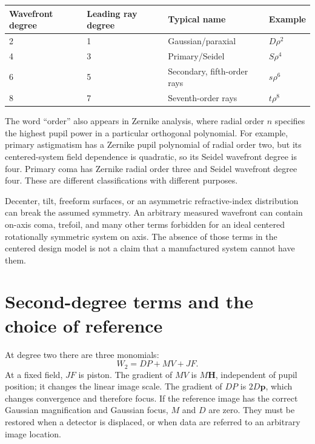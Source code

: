 \begin{center}
\begin{tabular}{llll}
\toprule
Wavefront degree & Leading ray degree & Typical name & Example\\
\midrule
2 & 1 & Gaussian/paraxial & $D\rho^2$\\
4 & 3 & Primary/Seidel & $S\rho^4$\\
6 & 5 & Secondary, fifth-order rays & $s\rho^6$\\
8 & 7 & Seventh-order rays & $t\rho^8$\\
\bottomrule
\end{tabular}
\end{center}

The word ``order'' also appears in Zernike analysis, where radial order $n$
specifies the highest pupil power in a particular orthogonal polynomial. For
example, primary astigmatism has a Zernike pupil polynomial of radial order
two, but its centered-system field dependence is quadratic, so its Seidel
wavefront degree is four. Primary coma has Zernike radial order three and
Seidel wavefront degree four. These are different classifications with
different purposes.

Decenter, tilt, freeform surfaces, or an asymmetric refractive-index distribution
can break the assumed symmetry. An arbitrary measured wavefront can contain
on-axis coma, trefoil, and many other terms forbidden for an ideal centered
rotationally symmetric system on axis. The absence of those terms in the
centered design model is not a claim that a manufactured system cannot have
them.

\section{Second-degree terms and the choice of reference}
At degree two there are three monomials:
\begin{equation}
 W_2=D P+M V+J F.
\end{equation}
At a fixed field, $JF$ is piston. The gradient of $MV$ is $M\bm H$, independent
of pupil position; it changes the linear image scale. The gradient of $DP$ is
$2D\bm p$, which changes convergence and therefore focus. If the reference
image has the correct Gaussian magnification and Gaussian focus, $M$ and $D$
are zero. They must be restored when a detector is displaced, or when data are
referred to an arbitrary image location.

